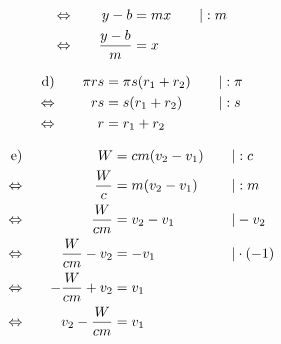 \begin{exercise}
\begin{minipage}[t]{0.47\linewidth}
\begin{alignat*}{3}
        \Leftrightarrow&\quad
        &
        y-b&=mx
        &
        \quad&|:m
        \\
        \Leftrightarrow&\quad
        &
        \frac{y-b}{m}&=x
        &
        \quad&\relax
      \end{alignat*}
    \end{minipage}\hfill
    \begin{minipage}[t]{0.51\linewidth}
      \makeatletter\@fleqntrue\makeatother
      \begin{alignat*}{3}
        \text{d)}&\quad
        &
        \pi rs&=\pi s(r_{1}+r_{2})
        &
        \quad&|:\pi
        \\
        \Leftrightarrow&\quad
        &
        rs&=s(r_{1}+r_{2})
        &
        \quad&|:s
        \\
        \Leftrightarrow&\quad
        &
        r&=r_{1}+r_{2}
        &
        \quad&\relax
      \end{alignat*}
    \end{minipage}
    \begin{minipage}[t]{0.47\linewidth}
      \makeatletter\@fleqntrue\makeatother
      \begin{alignat*}{3}
        \text{e)}&\quad
        &
        W&=cm(v_{2}-v_{1})
        &
        \quad&|:c
        \\
        \Leftrightarrow&\quad
        &
        \frac{W}{c}&=m(v_{2}-v_{1})
        &
        \quad&|:m
        \\
        \Leftrightarrow&\quad
        &
        \frac{W}{cm}&=v_{2}-v_{1}
        &
        \quad&|-v_{2}
        \\
        \Leftrightarrow&\quad
        &
        \frac{W}{cm}-v_{2}&=-v_{1}
        &
        \quad&|\cdot(-1)
        \\
        \Leftrightarrow&\quad
        &
        -\frac{W}{cm}+v_{2}&=v_{1}
        &
        \quad&\relax
        \\
        \Leftrightarrow&\quad
        &
        v_{2}-\frac{W}{cm}&=v_{1}
        &
        \quad&\relax
      \end{alignat*}
    \end{minipage}\hfill
    \begin{minipage}[t]{0.51\linewidth}
      \makeatletter\@fleqntrue\makeatother

\end{minipage}
\end{exercise}
